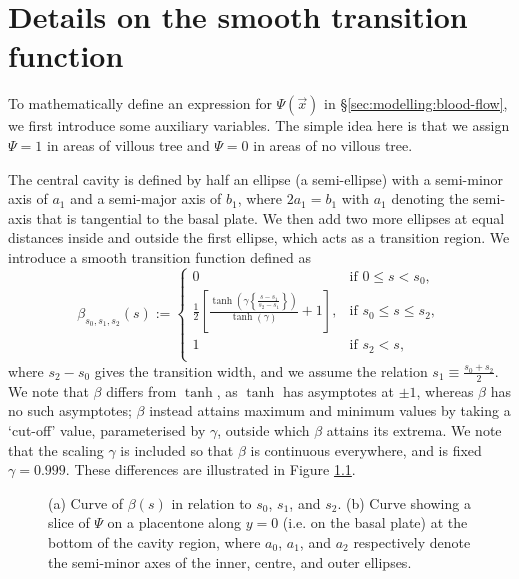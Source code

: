 \chapter{Details on the smooth transition function} \label{sec:smooth-transition}    
    To mathematically define an expression for $\Psi(\vec{x})$ in \S\ref{sec:modelling:blood-flow}, we first introduce some auxiliary variables. The simple idea here is that we assign $\Psi = 1$ in areas of villous tree and $\Psi = 0$ in areas of no villous tree.    
    
    The central cavity is defined by half an ellipse (a semi-ellipse) with a semi-minor axis of $a_1$ and a semi-major axis of $b_1$, where $2a_1 = b_1$ with $a_1$ denoting the semi-axis that is tangential to the basal plate. We then add two more ellipses at equal distances inside and outside the first ellipse, which acts as a transition region. We introduce a smooth transition function defined as
    \begin{equation}
        \beta_{s_0,s_1,s_2}(s) := 
        \begin{cases}
            0 & \text{if } 0 \leq s < s_0, \\
            \frac{1}{2}\left[ \frac{\tanh(\gamma\left\{ \frac{s-s_1}{s_2-s_1} \right\})}{\tanh(\gamma)} + 1 \right], & \text{if } s_0 \leq s \leq s_2, \\
            1 & \text{if } s_2 < s, \\
        \end{cases}
    \end{equation}
    where $s_2 - s_0$ gives the transition width, and we assume the relation $s_1 \equiv \frac{s_0 + s_2}{2}$. We note that $\beta$ differs from $\tanh$, as $\tanh$ has asymptotes at $\pm 1$, whereas $\beta$ has no such asymptotes; $\beta$ instead attains maximum and minimum values by taking a `cut-off' value, parameterised by $\gamma$, outside which $\beta$ attains its extrema. We note that the scaling $\gamma$ is included so that $\beta$ is continuous everywhere, and is fixed $\gamma = 0.999$. These differences are illustrated in Figure \ref{fig:transition:beta}.

    \begin{figure}
        \begin{subfigure}[b]{0.45\textwidth}
            \centering
            
            \caption{}
            \label{fig:transition:beta}
        \end{subfigure}
        \hfill
        \begin{subfigure}[b]{0.45\textwidth}
            \centering
            
            \caption{}
            \label{fig:transition:slice}
        \end{subfigure}
        \caption{(a) Curve of $\beta(s)$ in relation to $s_0$, $s_1$, and $s_2$. (b) Curve showing a slice of $\Psi$ on a placentone along $y = 0$ (i.e. on the basal plate) at the bottom of the cavity region, where $a_0$, $a_1$, and $a_2$ respectively denote the semi-minor axes of the inner, centre, and outer ellipses.}
        \label{fig:transition}
    \end{figure}

